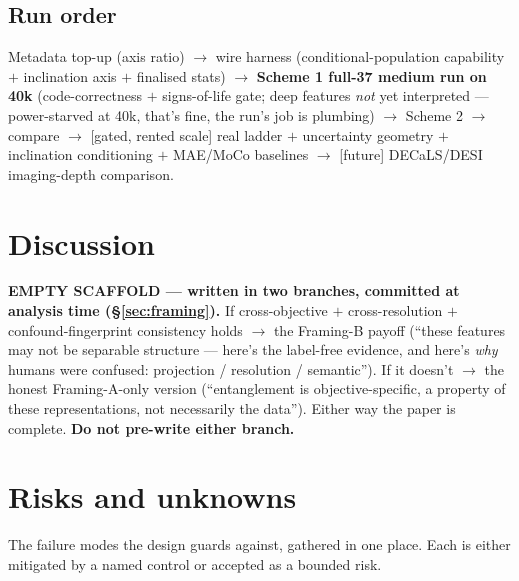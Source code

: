 \documentclass[11pt,a4paper]{article}
\begin{document}
\subsection{Run order}
Metadata top-up (axis ratio) $\rightarrow$ wire harness (conditional-population capability $+$
inclination axis $+$ finalised stats) $\rightarrow$ \textbf{Scheme 1 full-37 medium run on
40k} (code-correctness $+$ signs-of-life gate; deep features \emph{not} yet interpreted ---
power-starved at 40k, that's fine, the run's job is plumbing) $\rightarrow$ Scheme 2
$\rightarrow$ compare $\rightarrow$ [gated, rented scale] real ladder $+$ uncertainty geometry
$+$ inclination conditioning $+$ MAE/MoCo baselines $\rightarrow$ [future] DECaLS/DESI
imaging-depth comparison.

\section{Discussion}\label{sec:discussion}

\begin{deferredbox}
\textbf{EMPTY SCAFFOLD --- written in two branches, committed at analysis time
(\S\ref{sec:framing}).} If cross-objective $+$ cross-resolution $+$ confound-fingerprint
consistency holds $\rightarrow$ the Framing-B payoff (``these features may not be separable
structure --- here's the label-free evidence, and here's \emph{why} humans were confused:
projection / resolution / semantic''). If it doesn't $\rightarrow$ the honest Framing-A-only
version (``entanglement is objective-specific, a property of these representations, not
necessarily the data''). Either way the paper is complete. \textbf{Do not pre-write either
branch.}
\end{deferredbox}

\section{Risks and unknowns}\label{sec:risks}

The failure modes the design guards against, gathered in one place. Each is either mitigated by a
named control or accepted as a bounded risk.
\end{document}
